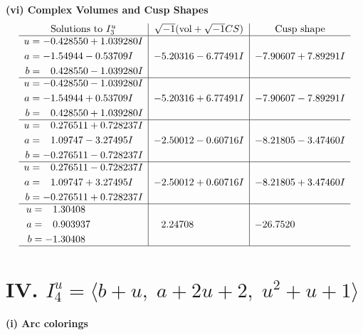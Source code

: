 \documentclass[1p]{elsarticle_modified}
\theoremstyle{definition}
\newcommand{\I}{\sqrt{-1}}
\begin{document}
\newpage\flushleft \textbf{(vi) Complex Volumes and Cusp Shapes}
$$\begin{array}{c|c|c}  
\text{Solutions to }I^u_{3}& \I (\text{vol} + \sqrt{-1}CS) & \text{Cusp shape}\\
 \hline 
\begin{aligned}
u &= -0.428550 + 1.039280 I \\
a &= -1.54944 - 0.53709 I \\
b &= \phantom{-}0.428550 - 1.039280 I\end{aligned}
 & -5.20316 - 6.77491 I & -7.90607 + 7.89291 I \\ \hline\begin{aligned}
u &= -0.428550 - 1.039280 I \\
a &= -1.54944 + 0.53709 I \\
b &= \phantom{-}0.428550 + 1.039280 I\end{aligned}
 & -5.20316 + 6.77491 I & -7.90607 - 7.89291 I \\ \hline\begin{aligned}
u &= \phantom{-}0.276511 + 0.728237 I \\
a &= \phantom{-}1.09747 - 3.27495 I \\
b &= -0.276511 - 0.728237 I\end{aligned}
 & -2.50012 - 0.60716 I & -8.21805 - 3.47460 I \\ \hline\begin{aligned}
u &= \phantom{-}0.276511 - 0.728237 I \\
a &= \phantom{-}1.09747 + 3.27495 I \\
b &= -0.276511 + 0.728237 I\end{aligned}
 & -2.50012 + 0.60716 I & -8.21805 + 3.47460 I \\ \hline\begin{aligned}
u &= \phantom{-}1.30408\phantom{ +0.000000I} \\
a &= \phantom{-}0.903937\phantom{ +0.000000I} \\
b &= -1.30408\phantom{ +0.000000I}\end{aligned}
 & \phantom{-}2.24708\phantom{ +0.000000I} & -26.7520\phantom{ +0.000000I}\\
 \hline 
 \end{array}$$\newpage\newpage\renewcommand{\arraystretch}{1}
\centering \section*{IV. $I^u_{4}= \langle b+u,\;a+2 u+2,\;u^2+u+1 \rangle$}
\flushleft \textbf{(i) Arc colorings}\\
\end{document}
